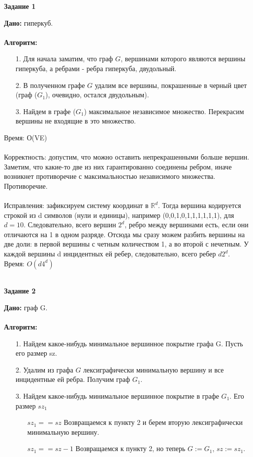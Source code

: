 \documentclass[12pt]{article} %
\begin{document}
	\begin{center}
		\textbf{Задание 1}\\
	\end{center}
	\textbf{Дано:} гиперкуб.\\
	\\
	\textbf{Алгоритм:}
	\begin{enumerate}
		\item[1.] Для начала заматим, что граф $G$, вершинами которого являются вершины гиперкуба, а ребрами - ребра гиперкуба, двудольный.
		\item[2.] В полученном графе $G$ удалим все вершины, покрашенные в черный цвет (граф ($G_1$), очевидно, остался двудольным).
		\item[3.] Найдем в графе ($G_1$) максимальное независимое множество. Перекрасим вершины не входящие в это множество.
	\end{enumerate}
	Время: О(VE)\\
	\\
	Корректность: допустим, что можно оставить непрекрашенными больше вершин. Заметим, что какие-то две из них гарантированно соединены ребром,
	иначе возникнет противоречие с максимальностью независимого множества. Противоречие.\\
	\\
	Исправления: зафиксируем систему координат в $\mathbb{R}^d$. Тогда вершина кодируется строкой из d символов (нули и единицы), например (0,0,1,0,1,1,1,1,1,1), для $d = 10$.
	Следовательно, всего вершин $2^d$, ребро между вершинами есть, если они отличаются на 1 в одном разряде. Отсюда мы сразу можем разбить вершины на две доли:
	в первой вершины с четным количеством 1, а во второй с нечетным. У каждой вершины d инцидентных ей ребер, следовательно, всего ребер $d2^d$.\\
	Время: $O(d4^d)$\\
	\\
	\begin{center}
		\textbf{Задание 2}\\
	\end{center}
	\textbf{Дано:} граф G.\\
	\\
	\textbf{Алгоритм:}\\
	\begin{enumerate}
		\item[1.] Найдем какое-нибудь минимальное вершинное покрытие графа G. Пусть его размер sz.
		\item[2.] Удалим из графа $G$ лексиграфически минимальную вершину и все инцидентные ей ребра. Получим граф $G_1$.
		\item[3.] Найдем какое-нибудь минимальное вершинное покрытие в графе $G_1$. Его размер $sz_1$
		\begin{enumerate}
			\item[$sz_1 == sz$] Возвращаемся к пункту 2 и берем вторую лексиграфически минимальную вершину.\\
			\item[$sz_1 == sz - 1$] Возвращаемся к пункту 2, но теперь $G := G_1$, $sz := sz_1$.
		\end{enumerate}
	\end{enumerate}
\end{document}
